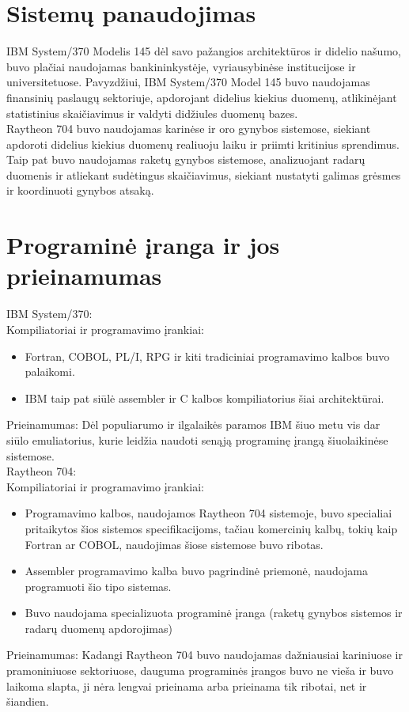 \documentclass{article}
\begin{document}
\section*{Sistemų panaudojimas}
IBM System/370 Modelis 145  dėl savo pažangios architektūros ir didelio našumo, buvo plačiai naudojamas bankininkystėje, vyriausybinėse institucijose ir universitetuose. Pavyzdžiui, IBM System/370 Model 145 buvo naudojamas finansinių paslaugų sektoriuje, apdorojant didelius kiekius duomenų, atlikinėjant statistinius skaičiavimus ir valdyti didžiules duomenų bazes.
\\
Raytheon 704 buvo naudojamas karinėse ir oro gynybos sistemose, siekiant apdoroti didelius kiekius duomenų realiuoju laiku ir priimti kritinius sprendimus. Taip pat buvo naudojamas raketų gynybos sistemose, analizuojant radarų duomenis ir atliekant sudėtingus skaičiavimus, siekiant nustatyti galimas grėsmes ir koordinuoti gynybos atsaką. 
\section*{Programinė įranga ir jos prieinamumas}
IBM System/370:\\
Kompiliatoriai ir programavimo įrankiai:
\begin{itemize}
    \item Fortran, COBOL, PL/I, RPG ir kiti tradiciniai programavimo kalbos buvo palaikomi.
    \item IBM taip pat siūlė assembler ir C kalbos kompiliatorius šiai architektūrai.
\end{itemize}
Prieinamumas: Dėl populiarumo ir ilgalaikės paramos IBM šiuo metu vis dar siūlo emuliatorius, kurie leidžia naudoti senąją programinę įrangą šiuolaikinėse sistemose.
\\
Raytheon 704:\\
Kompiliatoriai ir programavimo įrankiai:
\begin{itemize}
    \item Programavimo kalbos, naudojamos Raytheon 704 sistemoje, buvo specialiai pritaikytos šios sistemos specifikacijoms, tačiau komercinių kalbų, tokių kaip Fortran ar COBOL, naudojimas šiose sistemose buvo ribotas.
    \item Assembler programavimo kalba buvo pagrindinė priemonė, naudojama programuoti šio tipo sistemas.
    \item Buvo naudojama specializuota programinė įranga (raketų gynybos sistemos ir radarų duomenų apdorojimas) 
\end{itemize}
Prieinamumas: Kadangi Raytheon 704 buvo naudojamas dažniausiai kariniuose ir pramoniniuose sektoriuose, dauguma programinės įrangos buvo ne vieša ir buvo laikoma slapta, ji nėra lengvai prieinama arba prieinama tik ribotai, net ir šiandien.
\end{document}
